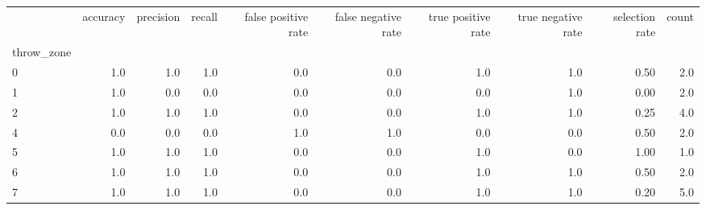 \begin{tabular}{lrrrrrrrrr}
\toprule
{} &  accuracy &  precision &  recall &  false positive rate &  false negative rate &  true positive rate &  true negative rate &  selection rate &  count \\
throw\_zone &           &            &         &                      &                      &                     &                     &                 &        \\
\midrule
0          &       1.0 &        1.0 &     1.0 &                  0.0 &                  0.0 &                 1.0 &                 1.0 &            0.50 &    2.0 \\
1          &       1.0 &        0.0 &     0.0 &                  0.0 &                  0.0 &                 0.0 &                 1.0 &            0.00 &    2.0 \\
2          &       1.0 &        1.0 &     1.0 &                  0.0 &                  0.0 &                 1.0 &                 1.0 &            0.25 &    4.0 \\
4          &       0.0 &        0.0 &     0.0 &                  1.0 &                  1.0 &                 0.0 &                 0.0 &            0.50 &    2.0 \\
5          &       1.0 &        1.0 &     1.0 &                  0.0 &                  0.0 &                 1.0 &                 0.0 &            1.00 &    1.0 \\
6          &       1.0 &        1.0 &     1.0 &                  0.0 &                  0.0 &                 1.0 &                 1.0 &            0.50 &    2.0 \\
7          &       1.0 &        1.0 &     1.0 &                  0.0 &                  0.0 &                 1.0 &                 1.0 &            0.20 &    5.0 \\
\bottomrule
\end{tabular}
